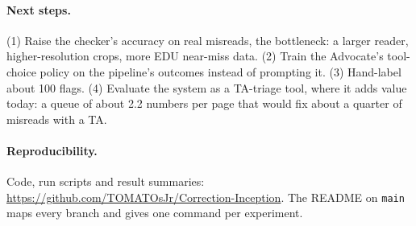 \documentclass[11pt]{article}
\newcommand{\tool}[1]{\texttt{\small #1}}
\begin{document}
\paragraph{Next steps.} (1) Raise the checker's accuracy on real misreads, the bottleneck: a larger reader, higher-resolution crops, more EDU near-miss data. (2) Train the Advocate's tool-choice policy on the pipeline's outcomes instead of prompting it. (3) Hand-label about 100 flags. (4) Evaluate the system as a TA-triage tool, where it adds value today: a queue of about 2.2 numbers per page that would fix about a quarter of misreads with a TA.

\paragraph{Reproducibility.} Code, run scripts and result summaries: \url{https://github.com/TOMATOsJr/Correction-Inception}. The README on \tool{main} maps every branch and gives one command per experiment.


\end{document}
